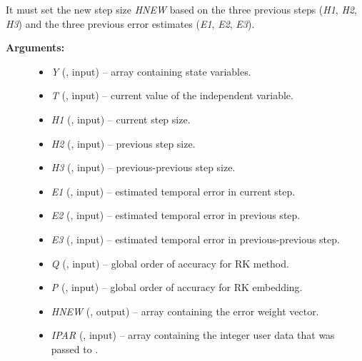 \documentclass[letterpaper,10pt,english]{sphinxmanual}
\begin{document}
\begin{fulllineitems}
\label{f_interface/Usage:f/_/FARKADAPT}
It must set the new step size \emph{HNEW} based on the three previous
steps (\emph{H1}, \emph{H2}, \emph{H3}) and the three previous error estimates
(\emph{E1}, \emph{E2}, \emph{E3}).
\begin{description}
\item[{\textbf{Arguments:}}] \leavevmode\begin{itemize}
\item {} 
\emph{Y} (, input) -- array containing state variables.

\item {} 
\emph{T} (, input) -- current value of the independent variable.

\item {} 
\emph{H1} (, input) -- current step size.

\item {} 
\emph{H2} (, input) -- previous step size.

\item {} 
\emph{H3} (, input) -- previous-previous step size.

\item {} 
\emph{E1} (, input) -- estimated temporal error in current step.

\item {} 
\emph{E2} (, input) -- estimated temporal error in previous step.

\item {} 
\emph{E3} (, input) -- estimated temporal error in previous-previous step.

\item {} 
\emph{Q} (, input) -- global order of accuracy for RK method.

\item {} 
\emph{P} (, input) -- global order of accuracy for RK embedding.

\item {} 
\emph{HNEW} (, output) -- array containing the error weight vector.

\item {} 
\emph{IPAR} (, input) -- array containing the integer
user data that was passed to {\hyperref[f_interface/Usage:f/_/FARKMALLOC]{}}.


\end{itemize}
\end{description}
\end{fulllineitems}
\end{document}
